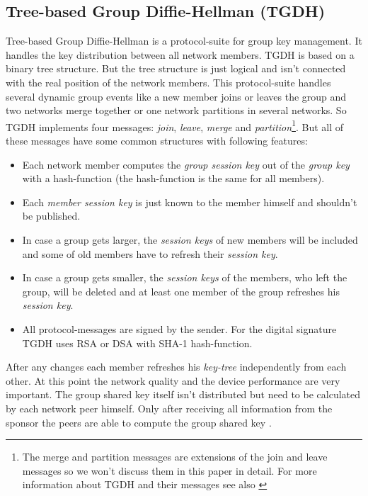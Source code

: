 \subsection{Tree-based Group Diffie-Hellman (TGDH)}\label{sec:TGDH}
Tree-based Group Diffie-Hellman is a protocol-suite for group key management. It handles the key distribution between all network members. TGDH is based on a binary tree structure. But the tree structure is just logical and isn't connected with the real position of the network members. This protocol-suite handles several dynamic group events like a new member joins or leaves the group and two networks merge together or one network partitions in several networks. So TGDH implements four messages: \textsl{join}, \textsl{leave}, \textsl{merge} and \textsl{partition}\footnote{The merge and partition messages are extensions of the join and leave messages so we won't discuss them in this paper in detail. For more information about TGDH and their messages see also \cite{Liao2004}}. But all of these messages have some common structures with following features:
\begin{itemize}
  \item Each network member computes the \textsl{group session key} out of the \textsl{group key} with a hash-function (the hash-function is the same for all members).
  \item Each \textsl{member session key} is just known to the member himself and shouldn't be published.
  \item In case a group gets larger, the \textsl{session keys} of new members will be included and some of old members have to refresh their \textsl{session key}.
  \item In case a group gets smaller, the \textsl{session keys} of the members, who left the group, will be deleted and at least one member of the group refreshes his \textsl{session key}.
  \item All protocol-messages are signed by the sender. For the digital signature TGDH uses RSA or DSA with SHA-1 hash-function. 
\end{itemize}
After any changes each member refreshes his \textsl{key-tree} independently from each other. At this point the network quality and the device performance are very important. The group shared key itself isn't distributed but need to be calculated by each network peer himself. Only after receiving all information from the sponsor the peers are able to compute the group shared key \cite{Liao2004}.\\


